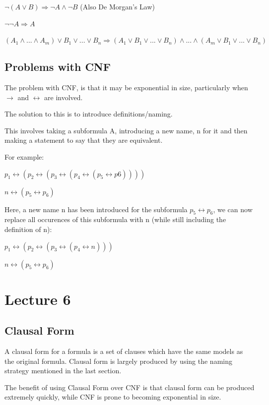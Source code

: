 \documentclass[11pt,a4paper]{article}
\begin{document}
$\neg(A \vee B) \Rightarrow \neg A \wedge \neg B$ (Also De Morgan's Law)

$\neg \neg A \Rightarrow A$

$(A_1 \wedge ... \wedge A_m) \vee B_1 \vee ... \vee B_n \Rightarrow (A_1 \vee B_1 \vee ... \vee B_n) \wedge ... \wedge (A_m \vee B_1 \vee ... \vee B_n)$

\subsection{Problems with CNF}

The problem with CNF, is that it may be exponential in size, particularly when $\rightarrow$ and $\leftrightarrow$ are involved.

The solution to this is to introduce definitions/naming.

This involves taking a subformula A, introducing a new name, n for it and then making a statement to say that they are equivalent.

For example:

$p_1 \leftrightarrow (p_2 \leftrightarrow (p_3 \leftrightarrow (p_4 \leftrightarrow (p_5 \leftrightarrow p6))))$

$n \leftrightarrow (p_5 \leftrightarrow p_6)$

Here, a new name n has been introduced for the subformula $p_5 \leftrightarrow p_6$, we can now replace all occurences of this subformula with n
(while still including the definition of n):

$p_1 \leftrightarrow (p_2 \leftrightarrow (p_3 \leftrightarrow (p_4 \leftrightarrow n)))$

$n \leftrightarrow (p_5 \leftrightarrow p_6)$

\section{Lecture 6}

\subsection{Clausal Form}

A clausal form for a formula is a set of clauses which have the same models as the original formula. Clausal form is largely produced by using the naming strategy mentioned in the last section.

The benefit of using Clausal Form over CNF is that clausal form can be produced extremely quickly, while CNF is prone to becoming exponential in size.
\end{document}
